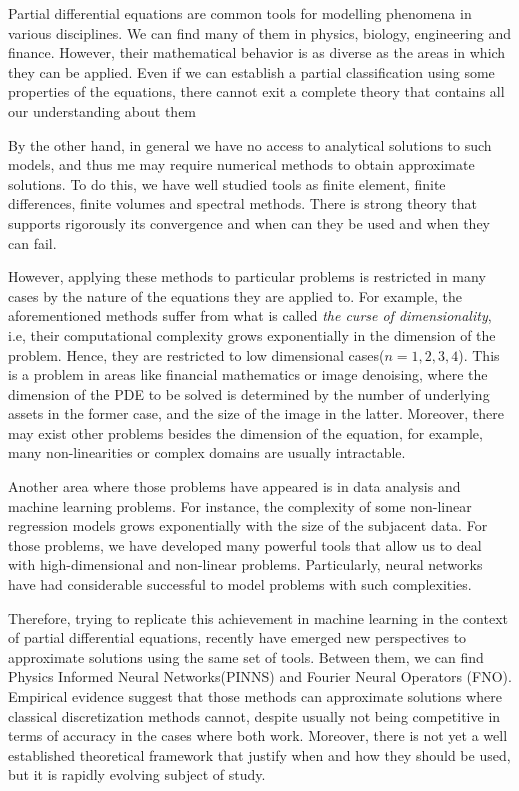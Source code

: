 Partial differential equations are common tools for modelling phenomena in various disciplines. We can find many of them in physics, biology, engineering and finance. However, their mathematical behavior is as diverse as the areas in which they can be applied. Even if we can establish a partial classification  using some properties of the equations, there cannot exit a complete theory that contains all our understanding about them

By the other hand, in general we have no access to analytical solutions to such models, and thus me may require numerical methods to obtain approximate solutions. To do this, we have well studied tools as finite element, finite differences, finite volumes and spectral methods. There is strong theory that supports rigorously its convergence and when can they be used and when they can fail.
 
However, applying these methods to particular problems is restricted in many cases by the nature of the equations they are applied to. For example, the aforementioned methods suffer from what is called \textit{the curse of dimensionality}, i.e, their computational complexity grows exponentially in the dimension of the problem. Hence, they are restricted to low dimensional cases($n=1,2,3,4$). This is a problem in areas like financial mathematics or image denoising, where the dimension of the PDE to be solved is determined by the number of underlying assets in the former case, and the size of the image in the latter. Moreover, there may exist other problems besides the dimension of the equation, for example, many non-linearities or complex domains are usually intractable. 

Another area where those problems have appeared is in data analysis and machine learning problems. For instance, the complexity of some non-linear regression models grows exponentially with the size of the subjacent data. For those problems, we have developed many powerful tools that allow us to deal with high-dimensional and non-linear problems. Particularly, neural networks have had considerable successful to model problems with such complexities\cite{higham_deep_2019}. 

Therefore, trying to replicate this achievement in machine learning in the context of partial differential equations, recently have emerged new perspectives to approximate solutions using the same set of tools. Between them, we can find Physics Informed Neural Networks(PINNS) \cite{raissi_physics-informed_2019,sirignano_dgm_2018} and Fourier Neural Operators (FNO)\cite{li_fourier_2021}. Empirical evidence suggest that those methods can approximate solutions where classical discretization methods cannot\cite{cuomo_scientific_2022,blechschmidt_three_2021}, despite usually not being competitive in terms of accuracy in the cases where both work. Moreover, there is not yet a well established theoretical framework that justify when and how they should be used, but it is rapidly evolving subject of study.

